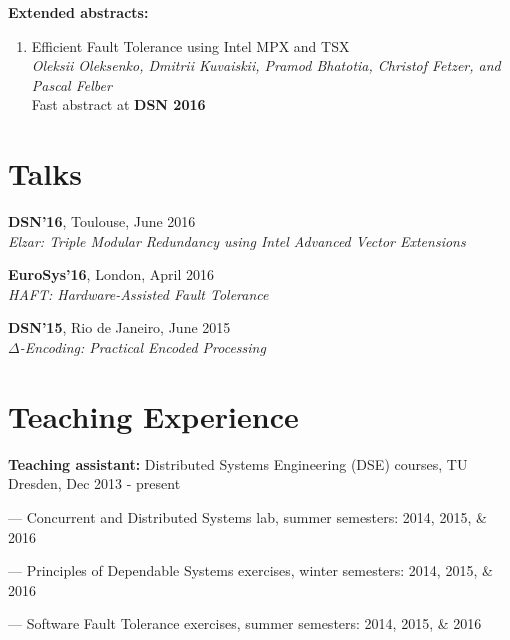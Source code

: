 \documentclass[letterpaper]{article}
\renewenvironment{itemize}{
  \begin{list}{}{
    \setlength{\leftmargin}{1.5em}
  }
}{
  \end{list}
}
\begin{document}
{\bf Extended abstracts:}

\begin{enumerate} [label= $\lbrack$\arabic*$\rbrack$, resume]

\item{Efficient Fault Tolerance using Intel MPX and TSX}\\
{\em Oleksii Oleksenko, {Dmitrii Kuvaiskii}, Pramod Bhatotia, Christof Fetzer, and Pascal Felber}\\
Fast abstract at {\bf DSN 2016}


\end{enumerate}


\section*{Talks}
\begin{itemize}
\item {\bf DSN'16}, Toulouse, June 2016\\
	{\em  Elzar: Triple Modular Redundancy using Intel Advanced Vector Extensions}

\item {\bf EuroSys'16}, London, April 2016\\
	{\em  HAFT: Hardware-Assisted Fault Tolerance}
	
\item {\bf DSN'15}, Rio de Janeiro, June 2015\\
{\em  $\Delta$-Encoding: Practical Encoded Processing}
\end{itemize}


\section*{Teaching Experience}

\begin{itemize}
\item {\bf Teaching assistant:} Distributed Systems Engineering (DSE) courses, TU Dresden, Dec 2013 - present
\begin{itemize}
	\item --- Concurrent and Distributed Systems lab, summer semesters: 2014, 2015, \& 2016
	\item --- Principles of Dependable Systems exercises, winter semesters: 2014, 2015, \& 2016
	\item --- Software Fault Tolerance exercises, summer semesters: 2014, 2015, \& 2016
\end{itemize}
\end{itemize}
\end{document}
